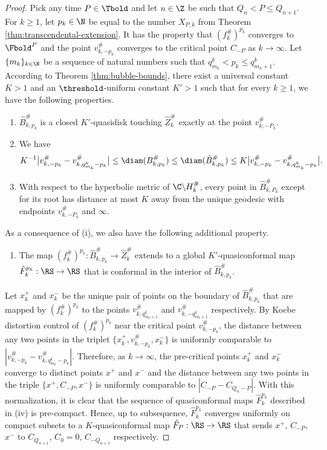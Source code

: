 \documentclass{amsart}
\begin{document}
\begin{proof}
    Pick any time $P \in \Tbold$ and let $n \in \Z$ be such that $Q_n < P \leq Q_{n+1}$.
    For $k \geq 1$, let $p_k \in \N$ be equal to the number $X_{P,k}$ from Theorem \ref{thm:transcendental-extension}.
    It has the property that $(f_k^{\#})^{p_k}$ converges to $\Fbold^P$ and the point $v_{k,-p_k}^{\#}$ converges to the critical point $C_{-P}$ as $k \to \infty$.
    Let $\{ m_k \}_{k\in \N}$ be a sequence of natural numbers such that $q^k_{m_k} < p_k \leq q^k_{m_k+1}$.
    According to Theorem \ref{thm:bubble-bounds}, there exist a universal constant $K>1$ and an $\threshold$-uniform constant $K'>1$ such that for every $k \geq 1$, we have the following properties.
    \begin{enumerate}
        \item[(i)] $\hat{B}_{k,p_k}^{\#}$ is a closed $K'$-quasidisk touching $\hat{Z}_k^{\#}$ exactly at the point $v_{k,-P_k}^{\#}$.
        \item[(ii)] We have
        \[
        K^{-1} \big| v^{\#}_{k, -p_k} - v^{\#}_{k, q^k_{m_k}- p_k} \big| \leq \diam(B_{k, p_k}^{\#}) \leq \diam(\hat{B}_{k, p_k}^{\#}) \leq 
        K \big| v^{\#}_{k, -p_k} - v^{\#}_{k, q^k_{m_k} - p_k} \big|.
        \]
        \item[(iii)] With respect to the hyperbolic metric of $\C \backslash H^{\#}_k$, every point in $\hat{B}_{k,P_k}^{\#}$ except for its root has distance at most $K$ away from the unique geodesic with endpoints $v^{\#}_{k,-P_k}$ and $\infty$.
    \end{enumerate}
    As a consequence of (i), we also have the following additional property.
    \begin{enumerate}
        \item[(iv)] The map $(f^{\#}_k)^{p_k}: \hat{B}_{k,p_k}^{\#} \to \hat{Z}^{\#}_k$ extends to a global $K'$-quasiconformal map $\hat{F}_k^{p_k}: \RS \to \RS$ that is conformal in the interior of $\hat{B}_{k, p_k}^{\#}$.
    \end{enumerate}  
    
    Let $x_{k}^+$ and $x_{k}^-$ be the unique pair of points on the boundary of $\hat{B}_{k,p_k}^{\#}$ that are mapped by $(f^{\#}_k)^{p_k}$ to the points $v^{\#}_{k,q^k_{m_k+1}}$ and $v^{\#}_{k,-q^k_{m_k+1}}$ respectively.
    By Koebe distortion control of $(f^{\#}_k)^{p_k}$ near the critical point $v^{\#}_{k,-p_k}$, the distance between any two points in the triplet $\{x_{k}^+, v^{\#}_{k,-p_k}, x_{k}^-\}$ is uniformly comparable to $| v^{\#}_{k,-p_k} - v^{\#}_{k,q^k_{m_k}-p_k} |$.
    Therefore, as $k \to \infty$, the pre-critical points $x_{k}^+$ and $x_{k}^-$ converge to distinct points $x^+$ and $x^-$ and the distance between any two points in the triple $\{x^+, C_{-P}, x^-\}$ is uniformly comparable to $|C_{-P} - C_{Q_{n}-P} |$.
    With this normalization, it is clear that the sequence of quasiconformal maps $\hat{F}_k^{p_k}$ described in (iv) is pre-compact. 
    Hence, up to subsequence, $\hat{F}_k^{p_k}$ converges uniformly on compact subsets to a $K$-quasiconformal map $\hat{F}_P : \RS \to \RS$ that sends $x^+$, $C_{-P}$, $x^-$ to $C_{Q_{n+1}}$, $C_0=0$, $C_{-Q_{n+1}}$ respectively.


\end{proof}
\end{document}
